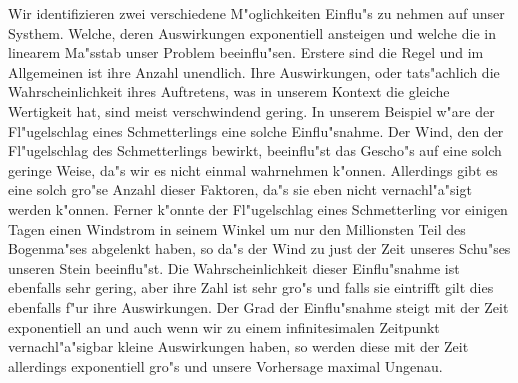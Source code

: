 \documentclass[a5paper,8pt]{book}
\begin{document}
Wir identifizieren zwei verschiedene M"oglichkeiten Einflu"s zu nehmen auf unser Systhem. Welche, deren Auswirkungen exponentiell ansteigen und welche die in linearem Ma"sstab unser Problem beeinflu"sen. Erstere sind die Regel und im Allgemeinen ist ihre Anzahl unendlich. Ihre Auswirkungen, oder tats"achlich die Wahrscheinlichkeit ihres Auftretens, was in unserem Kontext die gleiche Wertigkeit hat, sind meist verschwindend gering. In unserem Beispiel w"are der Fl"ugelschlag eines Schmetterlings eine solche Einflu"snahme. Der Wind, den der Fl"ugelschlag des Schmetterlings bewirkt, beeinflu"st das Gescho"s auf eine solch geringe Weise, da"s wir es nicht einmal wahrnehmen k"onnen. Allerdings gibt es eine solch gro"se Anzahl dieser Faktoren, da"s sie eben nicht vernachl"a"sigt werden k"onnen.
Ferner k"onnte der Fl"ugelschlag eines Schmetterling vor einigen Tagen einen Windstrom in seinem Winkel um nur den Millionsten Teil des Bogenma"ses abgelenkt haben, so da"s der Wind zu just der Zeit unseres Schu"ses unseren Stein beeinflu"st. Die Wahrscheinlichkeit dieser Einflu"snahme ist ebenfalls sehr gering, aber ihre Zahl ist sehr gro"s und falls sie eintrifft gilt dies ebenfalls f"ur ihre Auswirkungen.
Der Grad der Einflu"snahme steigt mit der Zeit exponentiell an und auch wenn wir zu einem infinitesimalen Zeitpunkt vernachl"a"sigbar kleine Auswirkungen haben, so werden diese mit der Zeit allerdings exponentiell gro"s und unsere Vorhersage maximal Ungenau.
\end{document}
